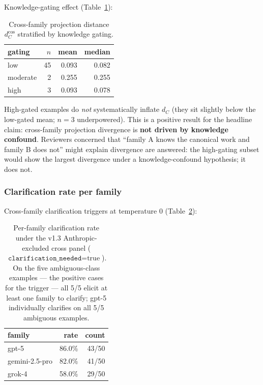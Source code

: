 Knowledge-gating effect (Table~\ref{tab:dc_by_gating}):

\begin{table}[t]
\centering
\caption{Cross-family projection distance $d_C^{\cos}$ stratified by knowledge gating.}
\label{tab:dc_by_gating}
\begin{tabular}{lrrr}
\toprule
\textbf{gating} & $n$ & \textbf{mean} & \textbf{median} \\
\midrule
low      & 45 & 0.093 & 0.082 \\
moderate &  2 & 0.255 & 0.255 \\
high     &  3 & 0.093 & 0.078 \\
\bottomrule
\end{tabular}
\end{table}

High-gated examples do \emph{not} systematically inflate $d_C$ (they sit slightly below the low-gated mean; $n = 3$ underpowered). This is a positive result for the headline claim: cross-family projection divergence is \textbf{not driven by knowledge confound}. Reviewers concerned that ``family A knows the canonical work and family B does not'' might explain divergence are answered: the high-gating subset would show the largest divergence under a knowledge-confound hypothesis; it does not.

\subsubsection{Clarification rate per family}
\label{sec:results:exp1:clarification}

Cross-family clarification triggers at temperature 0 (Table~\ref{tab:clarification}):

\begin{table}[t]
\centering
\caption{Per-family clarification rate under the v1.3 Anthropic-excluded cross panel ($\texttt{clarification\_needed} = \text{true}$). On the five ambiguous-class examples --- the positive cases for the trigger --- all 5/5 elicit at least one family to clarify; gpt-5 individually clarifies on all 5/5 ambiguous examples.}
\label{tab:clarification}
\begin{tabular}{lrr}
\toprule
\textbf{family} & \textbf{rate} & \textbf{count} \\
\midrule
gpt-5            & 86.0\% & 43/50 \\
gemini-2.5-pro   & 82.0\% & 41/50 \\
grok-4           & 58.0\% & 29/50 \\
\bottomrule
\end{tabular}
\end{table}


